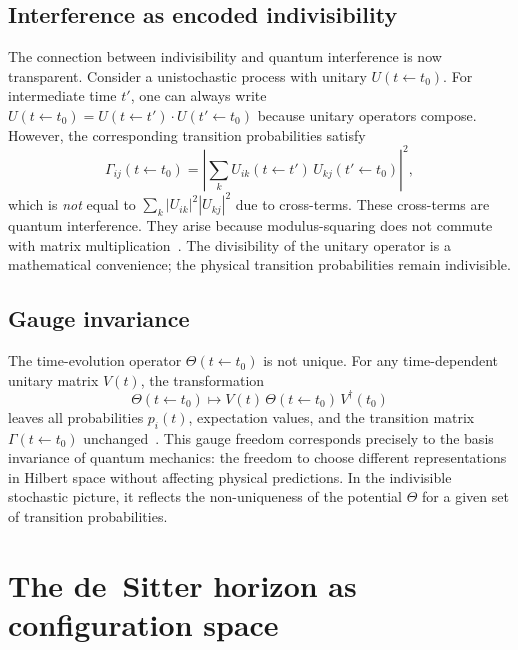 \documentclass[aps,prd,twocolumn,superscriptaddress,nofootinbib]{revtex4-2}
\begin{document}
\subsection{Interference as encoded indivisibility}

The connection between indivisibility and quantum interference is now transparent. Consider a unistochastic process with unitary $U(t \leftarrow t_0)$. For intermediate time $t'$, one can always write $U(t \leftarrow t_0) = U(t \leftarrow t') \cdot U(t' \leftarrow t_0)$ because unitary operators compose. However, the corresponding transition probabilities satisfy
\begin{equation}
\Gamma_{ij}(t \leftarrow t_0) = \left| \sum_{k} U_{ik}(t \leftarrow t') \, U_{kj}(t' \leftarrow t_0) \right|^2,
\label{eq:interference}
\end{equation}
which is \emph{not} equal to $\sum_k |U_{ik}|^2 |U_{kj}|^2$ due to cross-terms. These cross-terms are quantum interference. They arise because modulus-squaring does not commute with matrix multiplication~\cite{Barandes2025QSIP}. The divisibility of the unitary operator is a mathematical convenience; the physical transition probabilities remain indivisible.

\subsection{Gauge invariance}

The time-evolution operator $\Theta(t \leftarrow t_0)$ is not unique. For any time-dependent unitary matrix $V(t)$, the transformation
\begin{equation}
\Theta(t \leftarrow t_0) \mapsto V(t)\, \Theta(t \leftarrow t_0)\, V^{\dagger}(t_0)
\label{eq:gauge}
\end{equation}
leaves all probabilities $p_i(t)$, expectation values, and the transition matrix $\Gamma(t \leftarrow t_0)$ unchanged~\cite{Barandes2025QSIP}. This gauge freedom corresponds precisely to the basis invariance of quantum mechanics: the freedom to choose different representations in Hilbert space without affecting physical predictions. In the indivisible stochastic picture, it reflects the non-uniqueness of the potential $\Theta$ for a given set of transition probabilities.


\section{The de~Sitter horizon as configuration space}
\label{sec:deSitter}
\end{document}
